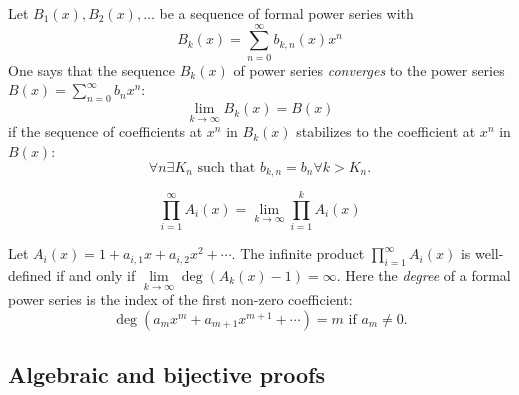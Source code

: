 \begin{page}
\setcounter{section}{3}
\setcounter{subsection}{4}
\setcounter{dfn}{7}
\label{portion:905}

\begin{dfn}
Let $B_1(x), B_2(x), \ldots$ be a sequence of formal power series with
\[
B_k(x) = \sum_{n=0}^\infty b_{k,n}(x) x^n
\]
One says that the sequence $B_k(x)$ of power series \emph{converges} to the power series $B(x) = \sum_{n=0}^\infty b_n x^n$:
\[
\lim_{k \to \infty} B_k(x) = B(x)
\]
if the sequence of coefficients at $x^n$ in $B_k(x)$ stabilizes to the coefficient at $x^n$ in $B(x)$:
\[
\forall n \exists K_n \text{ such that } b_{k,n} = b_n \forall k > K_n.
\]
\end{dfn}

\end{page}

\begin{page}
\setcounter{section}{3}
\setcounter{subsection}{4}
\setcounter{dfn}{8}
\label{portion:908}

\begin{dfn}
\[
\prod_{i=1}^\infty A_i(x) = \lim_{k \to \infty} \prod_{i=1}^k A_i(x)
\]
\end{dfn}

\end{page}

\begin{page}
\setcounter{section}{3}
\setcounter{subsection}{4}
\setcounter{dfn}{9}
\label{portion:911}

\begin{lem}
Let $A_i(x) = 1 + a_{i,1} x + a_{i,2} x^2 + \cdots$.
The infinite product $\prod_{i=1}^\infty A_i(x)$ is well-defined if and only if $\lim\limits_{k \to \infty} \deg (A_k(x) - 1) = \infty$.
Here the \emph{degree} of a formal power series is the index of the first non-zero coefficient:
\[
\deg (a_m x^m + a_{m+1} x^{m+1} + \cdots) = m \text{ if } a_m \ne 0.
\]
\end{lem}

\end{page}

\begin{page}
\setcounter{section}{3}
\setcounter{subsection}{5}
\setcounter{dfn}{9}
\label{portion:914}

\subsection{Algebraic and bijective proofs}

% 

\end{page}

